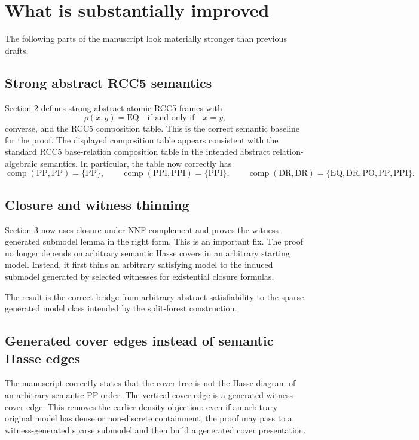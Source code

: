 \documentclass[11pt]{article}
\newcommand{\EQ}{\mathrm{EQ}}
\newcommand{\DR}{\mathrm{DR}}
\newcommand{\PO}{\mathrm{PO}}
\newcommand{\PP}{\mathrm{PP}}
\newcommand{\PPI}{\mathrm{PPI}}
\newcommand{\comp}{\operatorname{comp}}
\begin{document}
\section{What is substantially improved}

The following parts of the manuscript look materially stronger than previous drafts.

\subsection{Strong abstract RCC5 semantics}

Section 2 defines strong abstract atomic RCC5 frames with
\[
\rho(x,y)=\EQ \quad\text{if and only if}\quad x=y,
\]
converse, and the RCC5 composition table.  This is the correct semantic baseline for the proof.  The displayed composition table appears consistent with the standard RCC5 base-relation composition table in the intended abstract relation-algebraic semantics.  In particular, the table now correctly has
\[
\comp(\PP,\PP)=\{\PP\},\qquad
\comp(\PPI,\PPI)=\{\PPI\},\qquad
\comp(\DR,\DR)=\{\EQ,\DR,\PO,\PP,\PPI\}.
\]

\subsection{Closure and witness thinning}

Section 3 now uses closure under NNF complement and proves the witness-generated submodel lemma in the right form.  This is an important fix.  The proof no longer depends on arbitrary semantic Hasse covers in an arbitrary starting model.  Instead, it first thins an arbitrary satisfying model to the induced submodel generated by selected witnesses for existential closure formulas.

The result is the correct bridge from arbitrary abstract satisfiability to the sparse generated model class intended by the split-forest construction.

\subsection{Generated cover edges instead of semantic Hasse edges}

The manuscript correctly states that the cover tree is not the Hasse diagram of an arbitrary semantic \(\PP\)-order.  The vertical cover edge is a generated witness-cover edge.  This removes the earlier density objection: even if an arbitrary original model has dense or non-discrete containment, the proof may pass to a witness-generated sparse submodel and then build a generated cover presentation.
\end{document}
